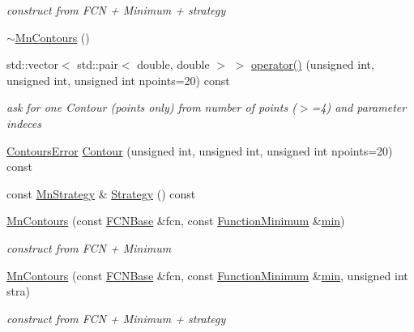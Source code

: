 \begin{DoxyCompactItemize}
\begin{DoxyCompactList}\small\item\em construct from F\+CN + Minimum + strategy \end{DoxyCompactList}\item 
\mbox{\hyperlink{classROOT_1_1Minuit2_1_1MnContours_a0764759095adb2129ae9282024af472a}{$\sim$\+Mn\+Contours}} ()
\item 
std\+::vector$<$ std\+::pair$<$ double, double $>$ $>$ \mbox{\hyperlink{classROOT_1_1Minuit2_1_1MnContours_a8d3577d628e22ad0513ed1eb71f8619b}{operator()}} (unsigned int, unsigned int, unsigned int npoints=20) const
\begin{DoxyCompactList}\small\item\em ask for one Contour (points only) from number of points ($>$=4) and parameter indeces \end{DoxyCompactList}\item 
\mbox{\hyperlink{classROOT_1_1Minuit2_1_1ContoursError}{Contours\+Error}} \mbox{\hyperlink{classROOT_1_1Minuit2_1_1MnContours_a8bcd5be6a72acc39c1b56fd45e9958ba}{Contour}} (unsigned int, unsigned int, unsigned int npoints=20) const
\item 
const \mbox{\hyperlink{classROOT_1_1Minuit2_1_1MnStrategy}{Mn\+Strategy}} \& \mbox{\hyperlink{classROOT_1_1Minuit2_1_1MnContours_a79b55e1c06425b314701c4a3e5b7b009}{Strategy}} () const
\item 
\mbox{\hyperlink{classROOT_1_1Minuit2_1_1MnContours_a87d983509ac3ce6f6635407a81e07153}{Mn\+Contours}} (const \mbox{\hyperlink{classROOT_1_1Minuit2_1_1FCNBase}{F\+C\+N\+Base}} \&fcn, const \mbox{\hyperlink{classROOT_1_1Minuit2_1_1FunctionMinimum}{Function\+Minimum}} \&\mbox{\hyperlink{adat__devel_2lib_2SU3_2SU3__internal_8h_ab0f5fed3171eb00d1c5f037d9f518a23}{min}})
\begin{DoxyCompactList}\small\item\em construct from F\+CN + Minimum \end{DoxyCompactList}\item 
\mbox{\hyperlink{classROOT_1_1Minuit2_1_1MnContours_af56ce1293967140b9ee0ea0b30fad690}{Mn\+Contours}} (const \mbox{\hyperlink{classROOT_1_1Minuit2_1_1FCNBase}{F\+C\+N\+Base}} \&fcn, const \mbox{\hyperlink{classROOT_1_1Minuit2_1_1FunctionMinimum}{Function\+Minimum}} \&\mbox{\hyperlink{adat__devel_2lib_2SU3_2SU3__internal_8h_ab0f5fed3171eb00d1c5f037d9f518a23}{min}}, unsigned int stra)
\begin{DoxyCompactList}\small\item\em construct from F\+CN + Minimum + strategy \end{DoxyCompactList}\item 

\end{DoxyCompactItemize}
